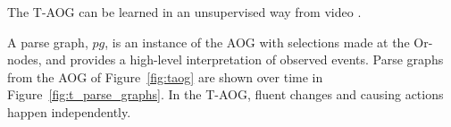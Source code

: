 \documentclass[10pt,journal,letterpaper,compsoc]{IEEEtran}
\begin{document}
The T-AOG can be learned in an unsupervised way from video \cite{SiUnsupervisedEvent}.


A parse graph, $pg$, is an instance of the AOG with selections made at the Or-nodes, and provides a high-level interpretation of observed events.  Parse graphs from the AOG of Figure~\ref{fig:taog} are shown over time in Figure~\ref{fig:t_parse_graphs}.  In the T-AOG, fluent changes and causing actions happen independently.  



\end{document}
